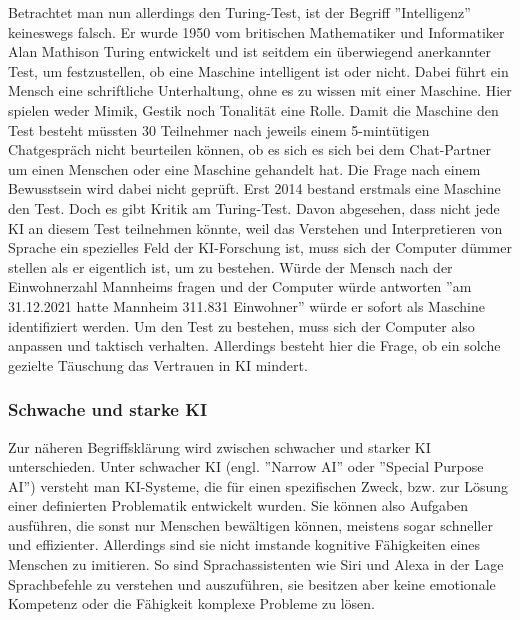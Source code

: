 \documentclass[a4paper,12pt, german]{report}
\begin{document}
Betrachtet man nun allerdings den Turing-Test, ist der Begriff ''Intelligenz'' keineswegs falsch.  Er wurde 1950 vom britischen Mathematiker und Informatiker Alan Mathison Turing entwickelt und ist seitdem ein überwiegend anerkannter Test, um festzustellen, ob eine Maschine intelligent ist oder nicht.
Dabei führt ein Mensch eine schriftliche Unterhaltung, ohne es zu wissen mit einer Maschine. Hier spielen weder Mimik, Gestik noch Tonalität eine Rolle. Damit die Maschine den Test besteht müssten 30 Teilnehmer nach jeweils einem 5-mintütigen Chatgespräch nicht beurteilen können, ob es sich es sich bei dem Chat-Partner um einen Menschen oder eine Maschine gehandelt hat. Die Frage nach einem Bewusstsein wird dabei nicht geprüft. Erst 2014 bestand erstmals eine Maschine den Test. \newline
Doch es gibt Kritik am Turing-Test. Davon abgesehen, dass nicht jede KI an diesem Test teilnehmen könnte, weil das Verstehen und Interpretieren von Sprache ein spezielles Feld der KI-Forschung ist, muss sich der Computer dümmer stellen als er eigentlich ist, um zu bestehen. Würde der Mensch nach der Einwohnerzahl Mannheims fragen und der Computer würde antworten ''am 31.12.2021 hatte Mannheim 311.831 Einwohner'' würde er sofort als Maschine identifiziert werden. Um den Test zu bestehen, muss sich der Computer also anpassen und taktisch verhalten. Allerdings besteht hier die Frage, ob ein solche gezielte Täuschung das Vertrauen in KI mindert. \cite{02}


\subsubsection{Schwache und starke KI}


Zur näheren Begriffsklärung wird zwischen schwacher und starker KI unterschieden. Unter schwacher KI (engl. ''Narrow AI'' oder ''Special Purpose AI'')  versteht man KI-Systeme, die für einen spezifischen Zweck, bzw. zur Lösung einer definierten Problematik entwickelt wurden. Sie können also Aufgaben ausführen, die sonst nur Menschen bewältigen können, meistens sogar schneller und effizienter. Allerdings sind sie nicht imstande kognitive Fähigkeiten eines Menschen zu imitieren. So sind Sprachassistenten wie Siri und Alexa in der Lage Sprachbefehle zu verstehen und auszuführen, sie besitzen aber keine emotionale Kompetenz oder die Fähigkeit komplexe Probleme zu lösen. \cite{01}\cite{15}
\end{document}
